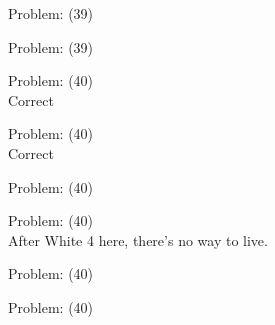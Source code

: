 \documentclass[11pt]{article}
\begin{document}
\begin{minipage}[t]{0.5\textwidth}
  {\centering
  
Problem: (39)\\
  }
\end{minipage}
\begin{minipage}[t]{0.5\textwidth}
  {\centering
  
Problem: (39)\\
  }
\end{minipage}
\begin{minipage}[t]{0.5\textwidth}
  {\centering
  
Problem: (40)\\
Correct\\
  }
\end{minipage}
\begin{minipage}[t]{0.5\textwidth}
  {\centering
  
Problem: (40)\\
Correct\\
  }
\end{minipage}
\begin{minipage}[t]{0.5\textwidth}
  {\centering
  
Problem: (40)\\
  }
\end{minipage}
\begin{minipage}[t]{0.5\textwidth}
  {\centering
  
Problem: (40)\\
After White 4 here, there's no way to live.\\
  }
\end{minipage}
\begin{minipage}[t]{0.5\textwidth}
  {\centering
  
Problem: (40)\\
  }
\end{minipage}
\begin{minipage}[t]{0.5\textwidth}
  {\centering
  
Problem: (40)\\
  }
\end{minipage}
\end{document}
